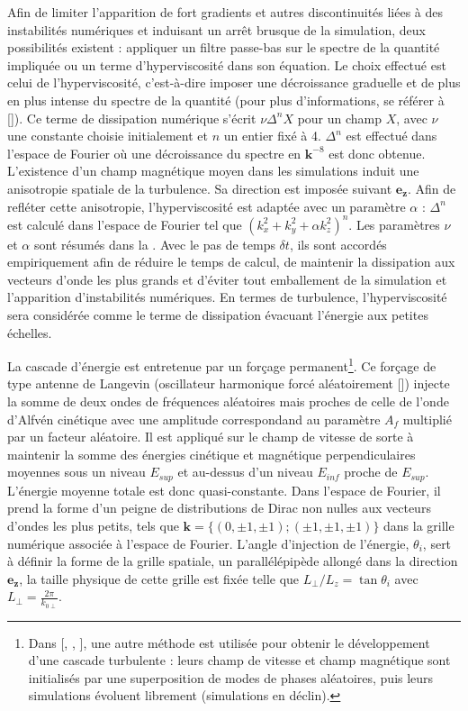  Afin de limiter l'apparition de fort gradients et autres discontinuités liées à des instabilités numériques et induisant un arrêt brusque de la simulation, deux possibilités existent : appliquer un filtre passe-bas sur le spectre de la quantité impliquée ou un terme d'hyperviscosité dans son équation. Le choix effectué est celui de l'hyperviscosité, c'est-à-dire imposer une décroissance graduelle et de plus en plus intense du spectre de la quantité (pour plus d'informations, se référer à [\cite{borue_forced_1995,frisch_hyperviscosity_2008}]). Ce terme de dissipation numérique s'écrit $\nu \Delta^{n} X$ pour un champ $X$, avec $\nu$ une constante choisie initialement et $n$ un entier fixé à 4. $\Delta^{n}$ est effectué dans l'espace de Fourier où une décroissance du spectre en $\boldsymbol{k}^{-8}$ est donc obtenue.   
 L'existence d'un champ magnétique moyen dans les simulations induit une anisotropie spatiale de la turbulence. Sa direction est imposée suivant $\boldsymbol{e_z}$. Afin de refléter cette anisotropie, l'hyperviscosité est adaptée avec un paramètre $\alpha$ : $\Delta^{n}$ est calculé dans l'espace de Fourier tel que $(k^2_x +  k^2_y + \alpha k^2_z)^n$. Les paramètres $\nu$ et $\alpha$ sont résumés dans la . Avec le pas de temps $\delta t$, ils sont accordés empiriquement afin de réduire le temps de calcul, de maintenir la dissipation aux vecteurs d'onde les plus grands et d'éviter tout emballement de la simulation et l'apparition d'instabilités numériques. En termes de turbulence, l'hyperviscosité sera considérée comme le terme de dissipation évacuant l'énergie aux petites échelles.
 
 La cascade d'énergie est entretenue par un forçage permanent\footnote{Dans [\cite{hellinger_von_2018}, \cite{gomez_parallel_2005}, \cite{mininni_hybrid_2011}], une autre méthode est utilisée pour obtenir le développement d'une cascade turbulente : leurs champ de vitesse et champ magnétique sont initialisés par une superposition de modes de phases aléatoires, puis leurs simulations évoluent librement (simulations en déclin).}. Ce forçage de type antenne de Langevin (oscillateur harmonique forcé aléatoirement [\cite{tenbarge_oscillating_2014}]) injecte la somme de deux ondes de fréquences aléatoires mais proches de celle de l'onde d'Alfvén cinétique avec une amplitude correspondand au paramètre $A_f$ multiplié par un facteur aléatoire. Il est  
appliqué sur le champ de vitesse de sorte à maintenir la somme des énergies cinétique et magnétique perpendiculaires moyennes sous un niveau $E_{sup}$ et au-dessus d'un niveau $E_{inf}$ proche de $E_{sup}$. L'énergie moyenne totale est donc quasi-constante. 
Dans l'espace de Fourier, il prend la forme d'un peigne de distributions de Dirac non nulles aux vecteurs d'ondes les plus petits, tels que $\boldsymbol{k} = \{(0,\pm 1, \pm 1);(\pm 1,\pm 1, \pm 1)\}$ dans la grille numérique associée à l'espace de Fourier. L'angle d'injection de l'énergie, $\theta_i$, sert à définir la forme de la grille spatiale, un parallélépipède allongé dans la direction $\boldsymbol{e_z}$, la taille physique de cette grille est fixée telle que $L_{\perp}/L_z = \tan \theta_i$ avec $L_{\perp} = \frac{2 \pi}{k_{0\perp}} $.
 
